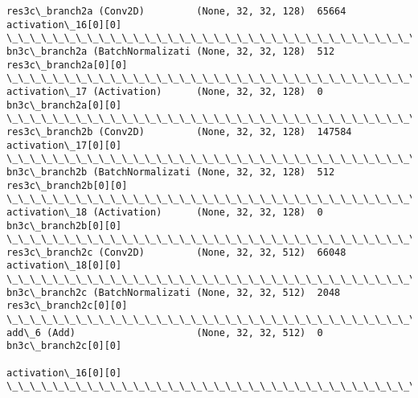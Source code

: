\documentclass[11pt]{article}
\begin{document}
\begin{Verbatim}[commandchars=\\\{\}]
res3c\_branch2a (Conv2D)         (None, 32, 32, 128)  65664       activation\_16[0][0]              
\_\_\_\_\_\_\_\_\_\_\_\_\_\_\_\_\_\_\_\_\_\_\_\_\_\_\_\_\_\_\_\_\_\_\_\_\_\_\_\_\_\_\_\_\_\_\_\_\_\_\_\_\_\_\_\_\_\_\_\_\_\_\_\_\_\_\_\_\_\_\_\_\_\_\_\_\_\_\_\_\_\_\_\_\_\_\_\_\_\_\_\_\_\_\_\_\_\_
bn3c\_branch2a (BatchNormalizati (None, 32, 32, 128)  512         res3c\_branch2a[0][0]             
\_\_\_\_\_\_\_\_\_\_\_\_\_\_\_\_\_\_\_\_\_\_\_\_\_\_\_\_\_\_\_\_\_\_\_\_\_\_\_\_\_\_\_\_\_\_\_\_\_\_\_\_\_\_\_\_\_\_\_\_\_\_\_\_\_\_\_\_\_\_\_\_\_\_\_\_\_\_\_\_\_\_\_\_\_\_\_\_\_\_\_\_\_\_\_\_\_\_
activation\_17 (Activation)      (None, 32, 32, 128)  0           bn3c\_branch2a[0][0]              
\_\_\_\_\_\_\_\_\_\_\_\_\_\_\_\_\_\_\_\_\_\_\_\_\_\_\_\_\_\_\_\_\_\_\_\_\_\_\_\_\_\_\_\_\_\_\_\_\_\_\_\_\_\_\_\_\_\_\_\_\_\_\_\_\_\_\_\_\_\_\_\_\_\_\_\_\_\_\_\_\_\_\_\_\_\_\_\_\_\_\_\_\_\_\_\_\_\_
res3c\_branch2b (Conv2D)         (None, 32, 32, 128)  147584      activation\_17[0][0]              
\_\_\_\_\_\_\_\_\_\_\_\_\_\_\_\_\_\_\_\_\_\_\_\_\_\_\_\_\_\_\_\_\_\_\_\_\_\_\_\_\_\_\_\_\_\_\_\_\_\_\_\_\_\_\_\_\_\_\_\_\_\_\_\_\_\_\_\_\_\_\_\_\_\_\_\_\_\_\_\_\_\_\_\_\_\_\_\_\_\_\_\_\_\_\_\_\_\_
bn3c\_branch2b (BatchNormalizati (None, 32, 32, 128)  512         res3c\_branch2b[0][0]             
\_\_\_\_\_\_\_\_\_\_\_\_\_\_\_\_\_\_\_\_\_\_\_\_\_\_\_\_\_\_\_\_\_\_\_\_\_\_\_\_\_\_\_\_\_\_\_\_\_\_\_\_\_\_\_\_\_\_\_\_\_\_\_\_\_\_\_\_\_\_\_\_\_\_\_\_\_\_\_\_\_\_\_\_\_\_\_\_\_\_\_\_\_\_\_\_\_\_
activation\_18 (Activation)      (None, 32, 32, 128)  0           bn3c\_branch2b[0][0]              
\_\_\_\_\_\_\_\_\_\_\_\_\_\_\_\_\_\_\_\_\_\_\_\_\_\_\_\_\_\_\_\_\_\_\_\_\_\_\_\_\_\_\_\_\_\_\_\_\_\_\_\_\_\_\_\_\_\_\_\_\_\_\_\_\_\_\_\_\_\_\_\_\_\_\_\_\_\_\_\_\_\_\_\_\_\_\_\_\_\_\_\_\_\_\_\_\_\_
res3c\_branch2c (Conv2D)         (None, 32, 32, 512)  66048       activation\_18[0][0]              
\_\_\_\_\_\_\_\_\_\_\_\_\_\_\_\_\_\_\_\_\_\_\_\_\_\_\_\_\_\_\_\_\_\_\_\_\_\_\_\_\_\_\_\_\_\_\_\_\_\_\_\_\_\_\_\_\_\_\_\_\_\_\_\_\_\_\_\_\_\_\_\_\_\_\_\_\_\_\_\_\_\_\_\_\_\_\_\_\_\_\_\_\_\_\_\_\_\_
bn3c\_branch2c (BatchNormalizati (None, 32, 32, 512)  2048        res3c\_branch2c[0][0]             
\_\_\_\_\_\_\_\_\_\_\_\_\_\_\_\_\_\_\_\_\_\_\_\_\_\_\_\_\_\_\_\_\_\_\_\_\_\_\_\_\_\_\_\_\_\_\_\_\_\_\_\_\_\_\_\_\_\_\_\_\_\_\_\_\_\_\_\_\_\_\_\_\_\_\_\_\_\_\_\_\_\_\_\_\_\_\_\_\_\_\_\_\_\_\_\_\_\_
add\_6 (Add)                     (None, 32, 32, 512)  0           bn3c\_branch2c[0][0]              
                                                                 activation\_16[0][0]              
\_\_\_\_\_\_\_\_\_\_\_\_\_\_\_\_\_\_\_\_\_\_\_\_\_\_\_\_\_\_\_\_\_\_\_\_\_\_\_\_\_\_\_\_\_\_\_\_\_\_\_\_\_\_\_\_\_\_\_\_\_\_\_\_\_\_\_\_\_\_\_\_\_\_\_\_\_\_\_\_\_\_\_\_\_\_\_\_\_\_\_\_\_\_\_\_\_\_

\end{Verbatim}
\end{document}
